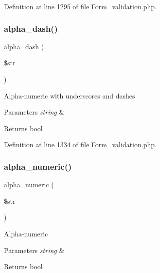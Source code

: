 Definition at line 1295 of file Form\+\_\+validation.\+php.

\mbox{\label{class_c_i___form__validation_a4d1ca92bb78369923e57b2f6aca58c70}} 
\subsubsection{\texorpdfstring{alpha\_dash()}{alpha\_dash()}}
{\footnotesize\ttfamily alpha\+\_\+dash (\begin{DoxyParamCaption}\item[{}]{\$str }\end{DoxyParamCaption})}

Alpha-\/numeric with underscores and dashes


\begin{DoxyParams}{Parameters}
{\em string} & \\
\hline
\end{DoxyParams}
\begin{DoxyReturn}{Returns}
bool 
\end{DoxyReturn}


Definition at line 1334 of file Form\+\_\+validation.\+php.

\mbox{\label{class_c_i___form__validation_aa3b561d437be2774b1a6850ada97024a}} 
\subsubsection{\texorpdfstring{alpha\_numeric()}{alpha\_numeric()}}
{\footnotesize\ttfamily alpha\+\_\+numeric (\begin{DoxyParamCaption}\item[{}]{\$str }\end{DoxyParamCaption})}

Alpha-\/numeric


\begin{DoxyParams}{Parameters}
{\em string} & \\
\hline
\end{DoxyParams}
\begin{DoxyReturn}{Returns}
bool 
\end{DoxyReturn}


